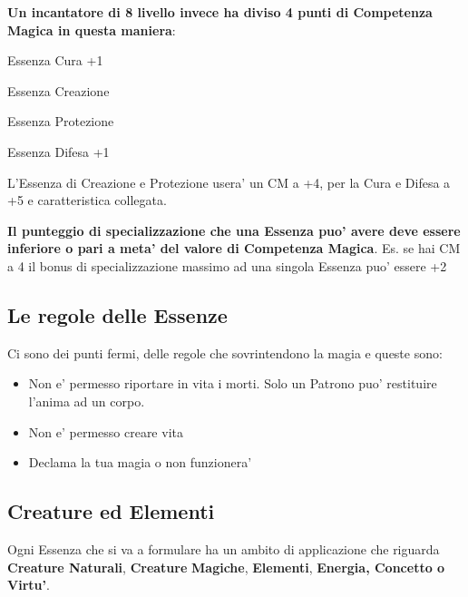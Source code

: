 \documentclass[a4paper,11pt,twoside,openany]{book}
\begin{document}
	\bigskip
	
	\textbf{Un incantatore di 8 livello invece ha diviso 4 punti di Competenza
		Magica in questa maniera}:
	
	Essenza Cura +1
	
	Essenza Creazione
	
	Essenza Protezione
	
	Essenza Difesa +1
	
	L'Essenza di Creazione e Protezione usera' un CM a +4, per la Cura e Difesa a +5 e caratteristica collegata.
	
	\bigskip
	
	\textbf{Il punteggio di specializzazione che una Essenza puo' avere deve essere inferiore o pari a meta' del valore di Competenza Magica}. Es. se hai CM a 4 il bonus di specializzazione massimo ad una singola Essenza puo' essere +2
	
	\subsection{Le regole delle Essenze}
	
	\label{le-regole-delle-essenze}
	
	Ci sono dei punti fermi, delle regole che sovrintendono la magia e queste sono:
	\begin{itemize}
		\item Non e' permesso riportare in vita i morti. Solo un Patrono puo' restituire l'anima ad un corpo. 
		
		\item Non e' permesso creare vita 
		
		\item Declama la tua magia o non funzionera' 
		
	\end{itemize}
	
	\subsection{Creature ed Elementi}
	
	\label{creature-ed-elementi}
	
	Ogni Essenza che si va a formulare ha un ambito di applicazione che riguarda \textbf{Creature Naturali}, \textbf{Creature} \textbf{Magiche},
	\textbf{Elementi}, \textbf{Energia, Concetto o Virtu'}.
	\bigskip
	
\end{document}
